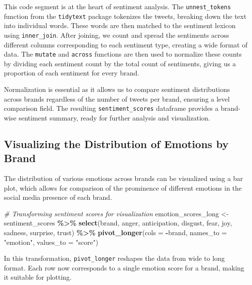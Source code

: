 \documentclass[
]{book}
\newenvironment{Shaded}{\begin{snugshade}}{\end{snugshade}}
\newcommand{\AttributeTok}[1]{\textcolor[rgb]{0.13,0.29,0.53}{#1}}
\newcommand{\CommentTok}[1]{\textcolor[rgb]{0.56,0.35,0.01}{\textit{#1}}}
\newcommand{\FunctionTok}[1]{\textcolor[rgb]{0.13,0.29,0.53}{\textbf{#1}}}
\newcommand{\NormalTok}[1]{#1}
\newcommand{\OtherTok}[1]{\textcolor[rgb]{0.56,0.35,0.01}{#1}}
\newcommand{\SpecialCharTok}[1]{\textcolor[rgb]{0.81,0.36,0.00}{\textbf{#1}}}
\newcommand{\StringTok}[1]{\textcolor[rgb]{0.31,0.60,0.02}{#1}}
\begin{document}
This code segment is at the heart of sentiment analysis. The \texttt{unnest\_tokens} function from the \texttt{tidytext} package tokenizes the tweets, breaking down the text into individual words. These words are then matched to the sentiment lexicon using \texttt{inner\_join}. After joining, we count and spread the sentiments across different columns corresponding to each sentiment type, creating a wide format of data. The \texttt{mutate} and \texttt{across} functions are then used to normalize these counts by dividing each sentiment count by the total count of sentiments, giving us a proportion of each sentiment for every brand.

Normalization is essential as it allows us to compare sentiment distributions across brands regardless of the number of tweets per brand, ensuring a level comparison field. The resulting \texttt{sentiment\_scores} dataframe provides a brand-wise sentiment summary, ready for further analysis and visualization.

\hypertarget{visualizing-the-distribution-of-emotions-by-brand}{%
\subsection{Visualizing the Distribution of Emotions by Brand}\label{visualizing-the-distribution-of-emotions-by-brand}}

The distribution of various emotions across brands can be visualized using a bar plot, which allows for comparison of the prominence of different emotions in the social media presence of each brand.

\begin{Shaded}
\begin{Highlighting}[]
\CommentTok{\# Transforming sentiment scores for visualization}
\NormalTok{emotion\_scores\_long }\OtherTok{\textless{}{-}}\NormalTok{ sentiment\_scores }\SpecialCharTok{\%\textgreater{}\%}
  \FunctionTok{select}\NormalTok{(brand, anger, anticipation, disgust, fear, joy, sadness, surprise, trust) }\SpecialCharTok{\%\textgreater{}\%}
  \FunctionTok{pivot\_longer}\NormalTok{(}\AttributeTok{cols =} \SpecialCharTok{{-}}\NormalTok{brand, }\AttributeTok{names\_to =} \StringTok{"emotion"}\NormalTok{, }\AttributeTok{values\_to =} \StringTok{"score"}\NormalTok{)}
\end{Highlighting}
\end{Shaded}

In this transformation, \texttt{pivot\_longer} reshapes the data from wide to long format. Each row now corresponds to a single emotion score for a brand, making it suitable for plotting.
\end{document}
